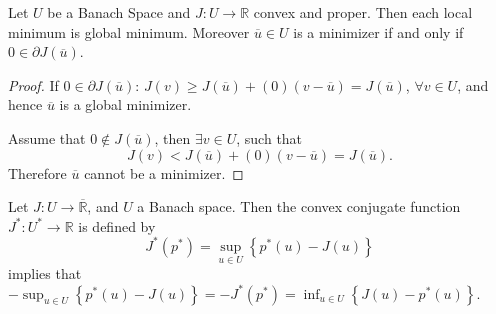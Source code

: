 \begin{theorem}
	\label{th6. 0 in subdifferential.}
	Let $U$ be a Banach Space and $J: U \rightarrow \mathbb{R}$ convex and proper. Then each local minimum is global minimum.
	Moreover $\overline{u}\in U$ is a minimizer if and only if $0 \in \partial J(\overline{u})$.
	\begin{proof}
		If $0 \in \partial J(\overline{u})$: $J(v) \geq J(\overline{u})+ (0)(v-\overline{u})=J(\overline{u})$, $\forall v\in U$, and hence $\overline{u}$ is a global minimizer. 
		
		
		Assume that $0 \notin J(\overline{u})$, then $\exists v \in U$, such that
		\[
			J(v) < J(\overline{u}) + (0)(v-\overline{u}) = J(\overline{u}).
		\]
		Therefore $\overline{u}$ cannot be a minimizer.
	\end{proof}
\end{theorem}

\begin{definition}[Duality]
Let $J:U\rightarrow \overline{\mathbb{R}}$, and $U$ a Banach space. Then the convex conjugate function $J^*: U^* \rightarrow \mathbb{R}$ is defined by
\[
	J^*(p^*)=\sup_{u\in U} \left\lbrace p^*(u)-J(u)\right\rbrace
\]
implies that $-\sup_{u\in U} \left\lbrace p^*(u)-J(u) \right\rbrace= -J^*(p^*)= \inf_{u\in U} \left\lbrace J(u)-p^*(u)\right\rbrace$.
\end{definition}

